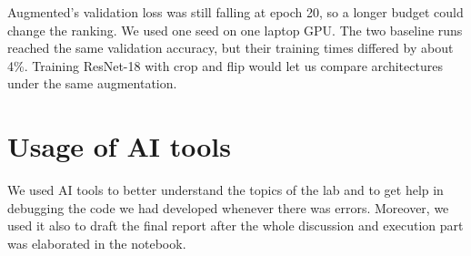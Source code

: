 \documentclass[11pt,a4paper]{article}
\begin{document}
Augmented's validation loss was still falling at epoch 20, so a longer budget could change the ranking. We used one seed on one laptop GPU. The two baseline runs reached the same validation accuracy, but their training times differed by about 4\%. Training ResNet-18 with crop and flip would let us compare architectures under the same augmentation.

\section{Usage of AI tools}
We used AI tools to better understand the topics of the lab and to get help in debugging the code we had developed whenever there was errors.
Moreover, we used it also to draft the final report after the whole discussion and execution part was elaborated in the notebook.
\end{document}
